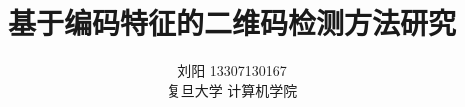 \documentclass[a4paper, twocolumn]{article}
\title{基于编码特征的二维码检测方法研究} %
\author{%
	\textsc{刘阳 13307130167} \\[1ex] %
	\normalsize 复旦大学 计算机学院 \\ %
}
\date{} %
\begin{document}
\begin{CJK}{UTF8}{gbsn}
	\maketitle
	
	
	
	
	
	
	
	
	\renewcommand{\refname}{参考文献}
	
	
\end{CJK}	
\end{document}
